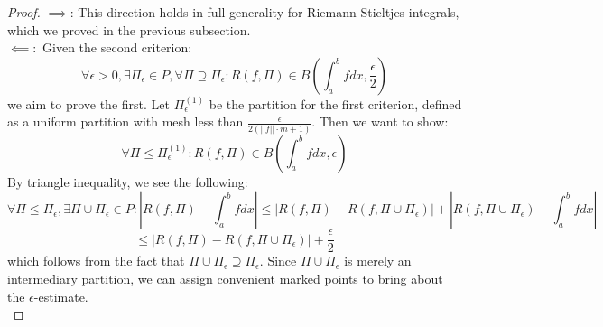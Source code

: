 \documentclass[10pt,letterpaper]{article} %
\begin{document}
\begin{proof}
$\implies$: This direction holds in full generality for Riemann-Stieltjes integrals, which we proved in the previous subsection.\\

$\impliedby:$ Given the second criterion:
\begin{equation*}
\forall \epsilon > 0, \exists \Pi_\epsilon \in P, \forall \Pi \supseteq \Pi_\epsilon: R(f, \Pi) \in B\left(\int_{a}^{b}fdx, \frac{\epsilon}{2}\right)
\end{equation*}
we aim to prove the first. Let $\Pi_\epsilon^{(1)}$ be the partition for the first criterion, defined as a uniform partition with mesh less than $\frac{\epsilon}{2(||f||\cdot m + 1)}$. Then we want to show:
\begin{equation*}
\forall \Pi \leq \Pi_\epsilon^{(1)}: R(f, \Pi) \in B\left(\int_{a}^{b}fdx, \epsilon\right)
\end{equation*}
By triangle inequality, we see the following:
\begin{equation*}
\forall \Pi \leq \Pi_\epsilon, \exists \Pi \cup \Pi_\epsilon \in P: \left|R(f, \Pi) - \int_{a}^{b}fdx\right| \leqslant \left|R(f, \Pi) - R(f, \Pi \cup \Pi_\epsilon)\right| + \left|R(f, \Pi \cup \Pi_\epsilon) - \int_{a}^{b}fdx\right|
\end{equation*}
\begin{equation*}
\leqslant |R(f, \Pi) - R(f, \Pi \cup \Pi_\epsilon)| + \frac{\epsilon}{2}
\end{equation*}
which follows from the fact that $\Pi \cup \Pi_\epsilon \supseteq \Pi_\epsilon$. Since $\Pi \cup \Pi_\epsilon$ is merely an intermediary partition, we can assign convenient marked points to bring about the $\epsilon$-estimate.\\




\end{proof}
\end{document}
